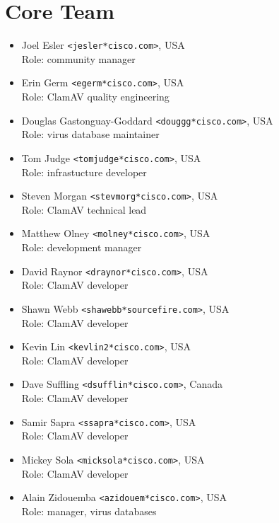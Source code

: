 \documentclass[a4paper,titlepage,12pt]{article}
\newcommand{\email}[1]{\texttt{#1}}
\begin{document}
    \section{Core Team}

    \begin{itemize}
	\item Joel Esler \email{<jesler*cisco.com>}, USA\\
	Role: community manager

	\item Erin Germ \email{<egerm*cisco.com>}, USA\\
	Role: ClamAV quality engineering

	\item Douglas Gastonguay-Goddard \email{<douggg*cisco.com>}, USA\\
	Role: virus database maintainer

	\item Tom Judge \email{<tomjudge*cisco.com>}, USA\\
	Role: infrastucture developer

	\item Steven Morgan \email{<stevmorg*cisco.com>}, USA\\
	Role: ClamAV technical lead

	\item Matthew Olney \email{<molney*cisco.com>}, USA\\
	Role: development manager

	\item David Raynor \email{<draynor*cisco.com>}, USA\\
	Role: ClamAV developer

	\item Shawn Webb \email{<shawebb*sourcefire.com>}, USA\\
	Role: ClamAV developer

	\item Kevin Lin \email{<kevlin2*cisco.com>}, USA\\
	Role: ClamAV developer

	\item Dave Suffling \email{<dsufflin*cisco.com>}, Canada\\
	Role: ClamAV developer

	\item Samir Sapra \email{<ssapra*cisco.com>}, USA\\
	Role: ClamAV developer

	\item Mickey Sola \email{<micksola*cisco.com>}, USA\\
	Role: ClamAV developer

	\item Alain Zidouemba \email{<azidouem*cisco.com>}, USA\\
	Role: manager, virus databases
      
    \end{itemize}
\end{document}
